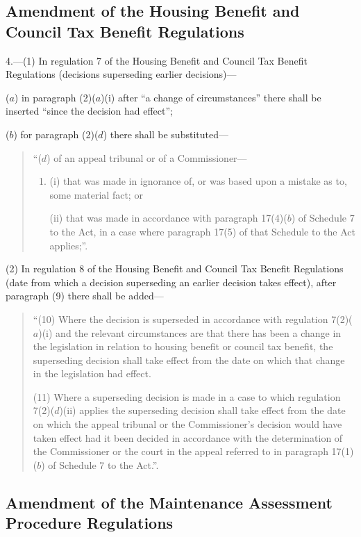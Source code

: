 \documentclass[12pt,a4paper]{article}
\begin{document}
\subsection[4. Amendment of the Housing Benefit and Council Tax Benefit Regulations]{Amendment of the Housing Benefit and Council Tax Benefit Regulations}

4.---(1)  In regulation 7 of the Housing Benefit and Council Tax Benefit Regulations (decisions superseding earlier decisions)—

($a$) in paragraph (2)($a$)(i)  after “a change of circumstances” there shall be inserted “since the decision had effect”;

($b$) for paragraph (2)($d$)  there shall be substituted—
\begin{quotation}
“($d$) of an appeal tribunal or of a Commissioner—
\begin{enumerate}\item[]
(i) that was made in ignorance of, or was based upon a mistake as to, some material fact; or

(ii) that was made in accordance with paragraph 17(4)($b$)  of Schedule 7 to the Act, in a case where paragraph 17(5) of that Schedule to the Act applies;”.
\end{enumerate}
\end{quotation}

(2) In regulation 8 of the Housing Benefit and Council Tax Benefit Regulations (date from which a decision superseding an earlier decision takes effect), after paragraph (9) there shall be added—
\begin{quotation}
“(10) Where the decision is superseded in accordance with regulation 7(2)($a$)(i)  and the relevant circumstances are that there has been a change in the legislation in relation to housing benefit or council tax benefit, the superseding decision shall take effect from the date on which that change in the legislation had effect.

(11) Where a superseding decision is made in a case to which regulation 7(2)($d$)(ii)  applies the superseding decision shall take effect from the date on which the appeal tribunal or the Commissioner’s decision would have taken effect had it been decided in accordance with the determination of the Commissioner or the court in the appeal referred to in paragraph 17(1)($b$)  of Schedule 7 to the Act.”.
\end{quotation}

\subsection[5. Amendment of the Maintenance Assessment Procedure Regulations]{Amendment of the Maintenance Assessment Procedure Regulations}
\end{document}
